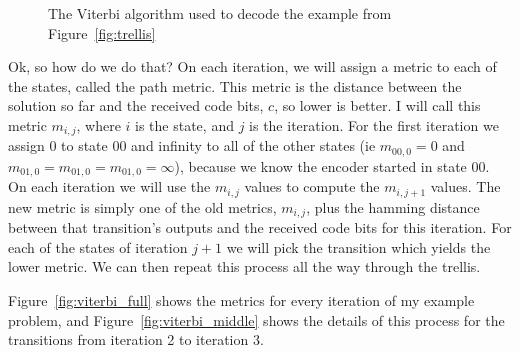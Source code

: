 \documentclass[11pt]{article}
\begin{document}
        \begin{figure*}[h]
        \centerline{
            \qquad
        }
        \caption{The Viterbi algorithm used to decode the example from
                 Figure~\ref{fig:trellis}}
        \label{fig:viterbi}
        \end{figure*}

        Ok, so how do we do that? On each iteration, we will assign a metric to
        each of the states, called the path metric. This metric is the distance
        between the solution so
        far and the received code bits, $c$, so lower is better. I will call
        this metric $m_{i,j}$, where $i$ is the state, and $j$ is the iteration.
        For the first iteration we assign $0$ to state $00$ and infinity 
        to all of the other states (ie $m_{00,0}=0$ and
        $m_{01,0} = m_{01,0} = m_{01,0} = \infty$), because we know the
        encoder started in state $00$.
        On each iteration we will use the $m_{i,j}$ values to compute the
        $m_{i,j+1}$ values.  The new metric is simply one of the old metrics,
        $m_{i,j}$, plus the hamming distance between that transition's outputs
        and the received code bits for this iteration. For each of the states of
        iteration $j+1$ we will pick the transition which yields the lower metric.
        We can then repeat this process all the way through the trellis.

        
        Figure~\ref{fig:viterbi_full} shows the metrics for every iteration of
        my example problem, and
        Figure~\ref{fig:viterbi_middle} shows the details of this process for the
        transitions from iteration 2 to iteration 3.
\end{document}
